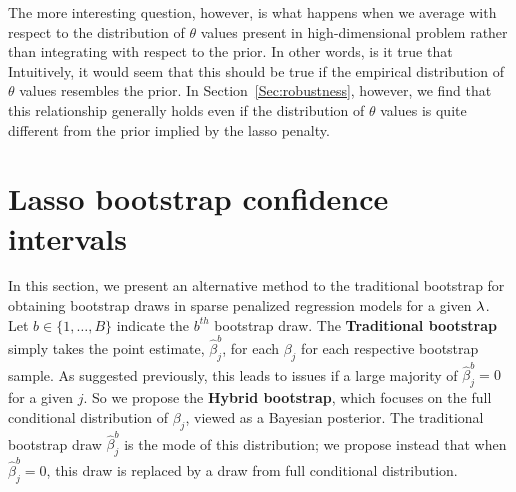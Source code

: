 The more interesting question, however, is what happens when we average with respect to the distribution of $\theta$ values present in high-dimensional problem rather than integrating with respect to the prior. In other words, is it true that
Intuitively, it would seem that this should be true if the empirical distribution of $\theta$ values resembles the prior. In Section~\ref{Sec:robustness}, however, we find that this relationship generally holds even if the distribution of $\theta$ values is quite different from the prior implied by the lasso penalty.

%


\section{Lasso bootstrap confidence intervals}\label{Sec:methods}

In this section, we present an alternative method to the traditional bootstrap for obtaining bootstrap draws in sparse penalized regression models for a given $\lambda$. Let $b \in \lbrace 1, \ldots, B \rbrace$ indicate the $b^{th}$ bootstrap draw. The \textbf{Traditional bootstrap} simply takes the point estimate, $\hat{\beta}_j^b$, for each $\beta_j$ for each respective bootstrap sample. As suggested previously, this leads to issues if a large majority of $\hat{\beta}_j^b = 0$ for a given $j$. So we propose the \textbf{Hybrid bootstrap}, which focuses on the full conditional distribution of $\beta_j$, viewed as a Bayesian posterior. The traditional bootstrap draw $\hat{\beta}_j^b$ is the mode of this distribution; we propose instead that when $\hat{\beta}_j^b = 0$, this draw is replaced by a draw from full conditional distribution.


